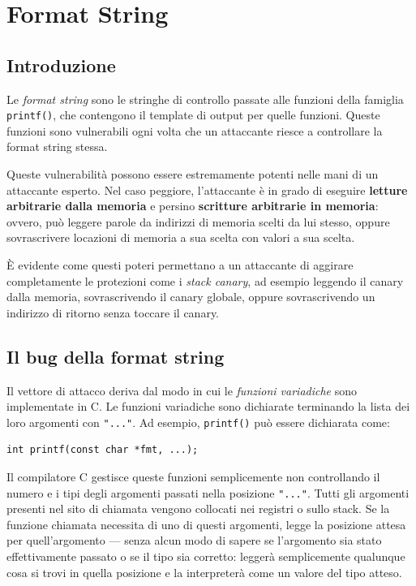 \documentclass{article}
\begin{document}
\section{Format String}

\subsection*{Introduzione}

Le \textit{format string} sono le stringhe di controllo passate alle funzioni della famiglia \texttt{printf()}, che contengono il template di output per quelle funzioni. Queste funzioni sono vulnerabili ogni volta che un attaccante riesce a controllare la format string stessa.

Queste vulnerabilità possono essere estremamente potenti nelle mani di un attaccante esperto. Nel caso peggiore, l'attaccante è in grado di eseguire \textbf{letture arbitrarie dalla memoria} e persino \textbf{scritture arbitrarie in memoria}: ovvero, può leggere parole da indirizzi di memoria scelti da lui stesso, oppure sovrascrivere locazioni di memoria a sua scelta con valori a sua scelta.

È evidente come questi poteri permettano a un attaccante di aggirare completamente le protezioni come i \textit{stack canary}, ad esempio leggendo il canary dalla memoria, sovrascrivendo il canary globale, oppure sovrascrivendo un indirizzo di ritorno senza toccare il canary.

\subsection*{Il bug della format string}

Il vettore di attacco deriva dal modo in cui le \textit{funzioni variadiche} sono implementate in C. Le funzioni variadiche sono dichiarate terminando la lista dei loro argomenti con \texttt{"..."}. Ad esempio, \texttt{printf()} può essere dichiarata come:

\begin{verbatim}
int printf(const char *fmt, ...);
\end{verbatim}

Il compilatore C gestisce queste funzioni semplicemente non controllando il numero e i tipi degli argomenti passati nella posizione \texttt{"..."}. Tutti gli argomenti presenti nel sito di chiamata vengono collocati nei registri o sullo stack. Se la funzione chiamata necessita di uno di questi argomenti, legge la posizione attesa per quell'argomento — senza alcun modo di sapere se l'argomento sia stato effettivamente passato o se il tipo sia corretto: leggerà semplicemente qualunque cosa si trovi in quella posizione e la interpreterà come un valore del tipo atteso.
\end{document}
